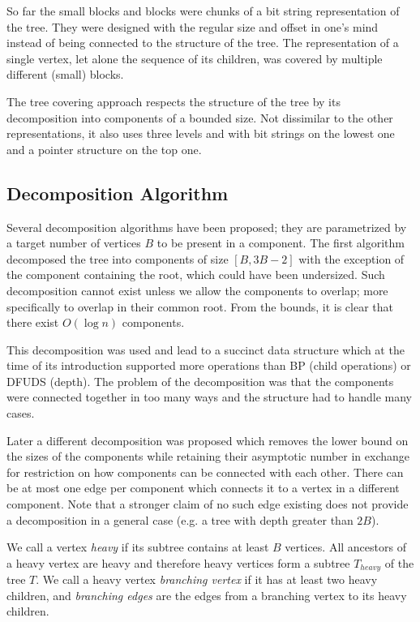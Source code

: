 So far the small blocks and blocks were chunks of a bit string representation of the tree.
They were designed with the regular size and offset in one's mind instead of being connected to the structure of the tree.
The representation of a single vertex, let alone the sequence of its children, was covered by multiple different (small) blocks.

The tree covering approach respects the structure of the tree by its decomposition into components of a bounded size.
Not dissimilar to the other representations, it also uses three levels and with bit strings on the lowest one and a pointer structure on the top one.

\subsection{Decomposition Algorithm}

Several decomposition algorithms have been proposed; they are parametrized by a target number of vertices $B$ to be present in a component.
The first algorithm  decomposed the tree into components of size $[B, 3 B - 2]$ with the exception of the component containing the root, which could have been undersized.
Such decomposition cannot exist unless we allow the components to overlap; more specifically to overlap in their common root.
From the bounds, it is clear that there exist $O(\log n)$ components.

This decomposition was used and lead to a succinct data structure which at the time of its introduction supported more operations than BP (child operations) or DFUDS (depth).
The problem of the decomposition was that the components were connected together in too many ways and the structure had to handle many cases.

Later a different decomposition was proposed which removes the lower bound on the sizes of the components while retaining their asymptotic number in exchange for restriction on how components can be connected with each other.
There can be at most one edge per component which connects it to a vertex in a different component.
Note that a stronger claim of no such edge existing does not provide a decomposition in a general case (e.g. a tree with depth greater than $2 B$).

We call a vertex \emph{heavy} if its subtree contains at least $B$ vertices.
All ancestors of a heavy vertex are heavy and therefore heavy vertices form a subtree $T_{heavy}$ of the tree $T$.
We call a heavy vertex \emph{branching vertex} if it has at least two heavy children, and \emph{branching edges} are the edges from a branching vertex to its heavy children.

